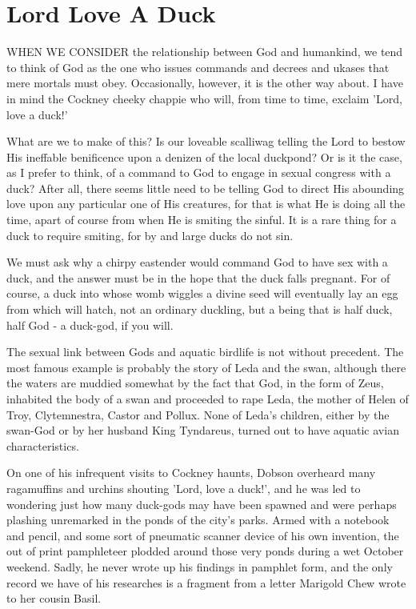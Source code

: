 \chapter{Lord Love A Duck}

WHEN WE CONSIDER the relationship between God and humankind, we tend to think of God as the one who issues commands and decrees and ukases that mere mortals must obey. Occasionally, however, it is the other way about. I have in mind the Cockney cheeky chappie who will, from time to time, exclaim 'Lord, love a duck!'

What are we to make of this? Is our loveable scalliwag telling the Lord to bestow His ineffable benificence upon a denizen of the local duckpond? Or is it the case, as I prefer to think, of a command to God to engage in sexual congress with a duck? After all, there seems little need to be telling God to direct His abounding love upon any particular one of His creatures, for that is what He is doing all the time, apart of course from when He is smiting the sinful. It is a rare thing for a duck to require smiting, for by and large ducks do not sin.

We must ask why a chirpy eastender would command God to have sex with a duck, and the answer must be in the hope that the duck falls pregnant. For of course, a duck into whose womb wiggles a divine seed will eventually lay an egg from which will hatch, not an ordinary duckling, but a being that is half duck, half God - a duck-god, if you will.

The sexual link between Gods and aquatic birdlife is not without precedent. The most famous example is probably the story of Leda and the swan, although there the waters are muddied somewhat by the fact that God, in the form of Zeus, inhabited the body of a swan and proceeded to rape Leda, the mother of Helen of Troy, Clytemnestra, Castor and Pollux. None of Leda's children, either by the swan-God or by her husband King Tyndareus, turned out to have aquatic avian characteristics.

On one of his infrequent visits to Cockney haunts, Dobson overheard many ragamuffins and urchins shouting 'Lord, love a duck!', and he was led to wondering just how many duck-gods may have been spawned and were perhaps plashing unremarked in the ponds of the city's parks. Armed with a notebook and pencil, and some sort of pneumatic scanner device of his own invention, the out of print pamphleteer plodded around those very ponds during a wet October weekend. Sadly, he never wrote up his findings in pamphlet form, and the only record we have of his researches is a fragment from a letter Marigold Chew wrote to her cousin Basil.

